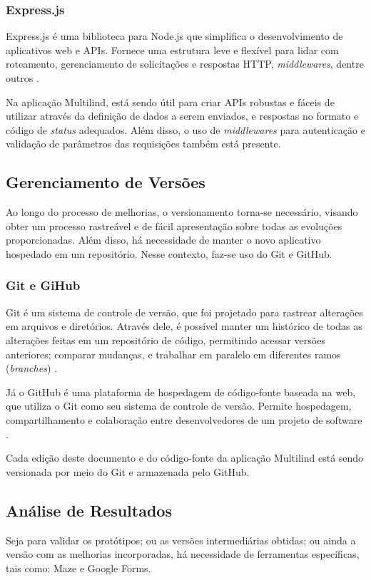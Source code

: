 \subsubsection{Express.js}
\label{sec:Express.js}
Express.js é uma biblioteca para Node.js que simplifica o desenvolvimento de aplicativos web e APIs. Fornece uma estrutura leve e flexível para 
lidar com roteamento, gerenciamento de solicitações e respostas HTTP, \textit{middlewares}, dentre outros \cite{expressjs}.

Na aplicação Multilind, está sendo útil para criar APIs robustas e fáceis de utilizar através da definição de dados a serem enviados, e respostas 
no formato e código de \textit{status} adequados. Além disso, o uso de \textit{middlewares} para autenticação e validação de parâmetros das requisições também está presente.

\subsection{Gerenciamento de Versões}
\label{sec:Gerenciamento de Versoes}
Ao longo do processo de melhorias, o versionamento torna-se necessário, visando obter um processo rastreável e de fácil apresentação sobre todas as evoluções 
proporcionadas. Além disso, há necessidade de manter o novo aplicativo hospedado em um repositório. Nesse contexto, faz-se uso do Git e GitHub.

\subsubsection{Git e GiHub}
\label{sec:Git e GiHub}
Git é um sistema de controle de versão, que foi projetado para rastrear alterações em arquivos e diretórios. Através dele, é 
possível manter um histórico de todas as alterações feitas em um repositório de código, permitindo acessar versões anteriores; 
comparar mudanças, e trabalhar em paralelo em diferentes ramos (\textit{branches}) \cite{git}.

Já o GitHub é uma plataforma de hospedagem de código-fonte baseada na web, que utiliza o Git como seu sistema de controle de 
versão. Permite hospedagem, compartilhamento e colaboração entre desenvolvedores de um projeto de software \cite{github}.

Cada edição deste documento e do código-fonte da aplicação Multilind está sendo versionada por meio do Git e armazenada pelo GitHub. 

\subsection{Análise de Resultados}
\label{sec:Análise de Resultados}
Seja para validar os protótipos; ou as versões intermediárias obtidas; ou ainda a versão com as melhorias incorporadas, há necessidade de ferramentas específicas, 
tais como: Maze e Google Forms.

